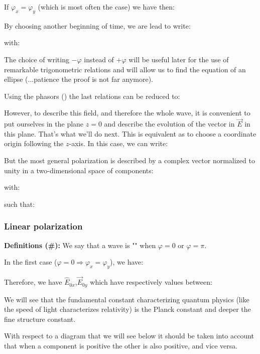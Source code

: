 	If $\varphi_x=\varphi_y$ (which is most often the case) we have then:
	
	By choosing another beginning of time, we are lead to write:
	
	with:
	
	\begin{tcolorbox}[title=Remark,colframe=black,arc=10pt]
	The choice of writing $-\varphi$ instead of $+\varphi$ will be useful later for the use of remarkable trigonometric relations and will allow us to find the equation of an ellipse (...patience the proof is not far anymore).
	\end{tcolorbox}
	Using the phasors () the last relations can be reduced to:
	
	However, to describe this field, and therefore the whole wave, it is convenient to put ourselves in the plane $z=0$ and describe the evolution of the vector in $\vec{E}$ in this plane. That's what we'll do next. This is equivalent as to choose a coordinate origin following the $z$-axis. In this case, we can write:
	
	But the most general polarization is described by a complex vector normalized to unity in a two-dimensional space of components:
	
	with:
	
	such that:
	
	
	
	\subsubsection{Linear polarization}\label{linear polarization}
	\textbf{Definitions (\#\mydef):} We say that a wave is "" when $\varphi=0$ or $\varphi=\pi$.

	In the first case ($\varphi=0\Rightarrow \varphi_x=\varphi_y$), we have:
	
	
	Therefore, we have $\hat{E}_{0x}$,$\vec{E}_{0y}$ which have respectively values between:
	
	\begin{tcolorbox}[title=Remark,colframe=black,arc=10pt]
	We will see that the fundamental constant characterizing quantum physics (like the speed of light characterizes relativity) is the Planck constant and deeper the fine structure constant.
	\end{tcolorbox}	
	With respect to a diagram that we will see below it should be taken into account that when a component is positive the other is also positive, and vice versa.

